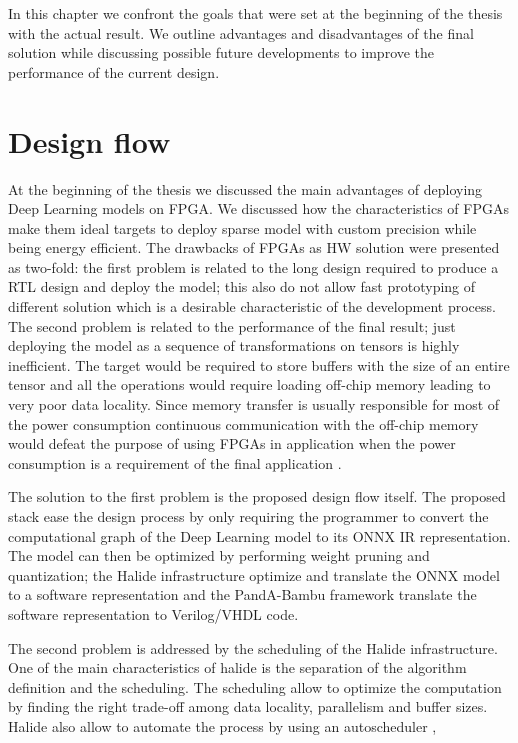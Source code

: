 \documentclass[../main.tex]{subfiles}
\begin{document}
In this chapter we confront the goals that were set at the beginning of the thesis with the actual result.
We outline advantages and disadvantages of the final solution while discussing possible future developments to improve the performance of the current design.

\newpage
\section{Design flow}
At the beginning of the thesis we discussed the main advantages of deploying Deep Learning models on FPGA.
We discussed how the characteristics of FPGAs make them ideal targets to deploy sparse model with custom precision while being energy efficient.
The drawbacks of FPGAs as HW solution were presented as two-fold: the first problem is related to the long design required to produce a RTL design and deploy the model; this also do not allow fast prototyping of different solution which is a desirable characteristic of the development process.
The second problem is related to the performance of the final result; just deploying the model as a sequence of transformations on tensors is highly inefficient. The target would be required to store buffers with the size of an entire tensor and all the operations would require loading off-chip memory leading to very poor data locality.
Since memory transfer is usually responsible for most of the power consumption continuous communication with the off-chip memory would defeat the purpose of using FPGAs in application when the power consumption is a requirement of the final application \cite{DBLP:journals/corr/abs-1901-04988}.

The solution to the first problem is the proposed design flow itself.
The proposed stack ease the design process by only requiring the programmer to convert the computational graph of the Deep Learning model to its ONNX IR representation.
The model can then be optimized by performing weight pruning and quantization; the Halide infrastructure optimize and translate the ONNX model to a software representation and the PandA-Bambu framework translate the software representation to Verilog/VHDL code.

The second problem is addressed by the scheduling of the Halide infrastructure.
One of the main characteristics of halide is the separation of the algorithm definition and the scheduling. 
The scheduling allow to optimize the computation by finding the right trade-off among data locality, parallelism and buffer sizes.
Halide also allow to automate the process by using an autoscheduler \cite{halideAutoscheduler},
\end{document}
